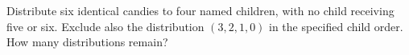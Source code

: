 Distribute six identical candies to four named children, with no child receiving five or six. Exclude also the distribution $(3,2,1,0)$ in the specified child order. How many distributions remain?
